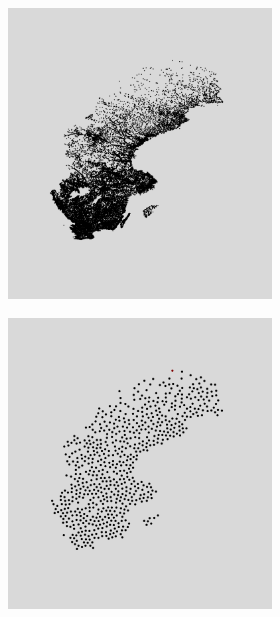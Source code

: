 \begin{figure}[H]
	\begin{subfigure}[b]{1\linewidth}
		\centering
	\begin{subfigure}[t]{0.29\linewidth}
		\centering
		\includegraphics[width=0.9\linewidth]{Pictures/sweden} 
		\caption{} 
		\label{fig:sweden2} 
		\vspace{4ex}
	\end{subfigure}%
	\begin{subfigure}[t]{0.29\linewidth}
		\centering
		\includegraphics[width=0.9\linewidth]{Pictures/bp5_1_sweden} 

\end{subfigure}
\end{subfigure}
\end{figure}
